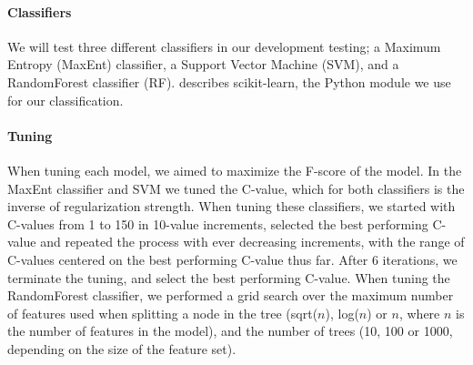 \documentclass[11pt,letterpaper]{article}
\begin{document}


\paragraph{Classifiers}

We will test three different classifiers in our development testing; a Maximum Entropy (MaxEnt) classifier, a Support Vector Machine (SVM), and a RandomForest classifier (RF).  describes scikit-learn, the Python module we use for our classification.

\paragraph{Tuning}
When tuning each model, we aimed to maximize the F-score of the model. In the MaxEnt classifier and SVM we tuned the C-value, which for both classifiers is the inverse of regularization strength. When tuning these classifiers, we started with C-values from 1 to 150 in 10-value increments, selected the best performing C-value and repeated the process with ever decreasing increments, with the range of C-values centered on the best performing C-value thus far. After 6 iterations, we terminate the tuning, and select the best performing C-value. When tuning the RandomForest classifier, we performed a grid search over the maximum number of features used when splitting a node in the tree (sqrt($n$), log($n$) or $n$, where $n$ is the number of features in the model), and the number of trees (10, 100 or 1000, depending on the size of the feature set).
\end{document}
